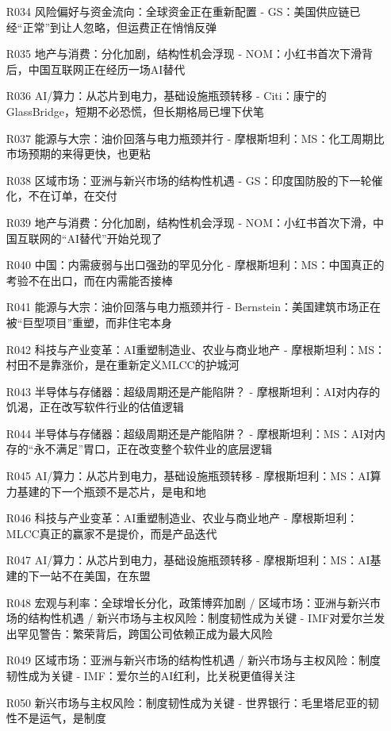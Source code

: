 \documentclass[11pt]{ctexart}
\begin{document}
\begin{itemize}
  \item [R034] 风险偏好与资金流向：全球资金正在重新配置 - GS：美国供应链已经“正常”到让人忽略，但运费正在悄悄反弹
  \item [R035] 地产与消费：分化加剧，结构性机会浮现 - NOM：小红书首次下滑背后，中国互联网正在经历一场AI替代
  \item [R036] AI/算力：从芯片到电力，基础设施瓶颈转移 - Citi：康宁的GlassBridge，短期不必恐慌，但长期格局已埋下伏笔
  \item [R037] 能源与大宗：油价回落与电力瓶颈并行 - 摩根斯坦利：MS：化工周期比市场预期的来得更快，也更粘
  \item [R038] 区域市场：亚洲与新兴市场的结构性机遇 - GS：印度国防股的下一轮催化，不在订单，在交付
  \item [R039] 地产与消费：分化加剧，结构性机会浮现 - NOM：小红书首次下滑，中国互联网的“AI替代”开始兑现了
  \item [R040] 中国：内需疲弱与出口强劲的罕见分化 - 摩根斯坦利：MS：中国真正的考验不在出口，而在内需能否接棒
  \item [R041] 能源与大宗：油价回落与电力瓶颈并行 - Bernstein：美国建筑市场正在被“巨型项目”重塑，而非住宅本身
  \item [R042] 科技与产业变革：AI重塑制造业、农业与商业地产 - 摩根斯坦利：MS：村田不是靠涨价，是在重新定义MLCC的护城河
  \item [R043] 半导体与存储器：超级周期还是产能陷阱？ - 摩根斯坦利：AI对内存的饥渴，正在改写软件行业的估值逻辑
  \item [R044] 半导体与存储器：超级周期还是产能陷阱？ - 摩根斯坦利：MS：AI对内存的“永不满足”胃口，正在改变整个软件业的底层逻辑
  \item [R045] AI/算力：从芯片到电力，基础设施瓶颈转移 - 摩根斯坦利：MS：AI算力基建的下一个瓶颈不是芯片，是电和地
  \item [R046] 科技与产业变革：AI重塑制造业、农业与商业地产 - 摩根斯坦利：MLCC真正的赢家不是提价，而是产品迭代
  \item [R047] AI/算力：从芯片到电力，基础设施瓶颈转移 - 摩根斯坦利：MS：AI基建的下一站不在美国，在东盟
  \item [R048] 宏观与利率：全球增长分化，政策博弈加剧 / 区域市场：亚洲与新兴市场的结构性机遇 / 新兴市场与主权风险：制度韧性成为关键 - IMF对爱尔兰发出罕见警告：繁荣背后，跨国公司依赖正成为最大风险
  \item [R049] 区域市场：亚洲与新兴市场的结构性机遇 / 新兴市场与主权风险：制度韧性成为关键 - IMF：爱尔兰的AI红利，比关税更值得关注
  \item [R050] 新兴市场与主权风险：制度韧性成为关键 - 世界银行：毛里塔尼亚的韧性不是运气，是制度

\end{itemize}
\end{document}
